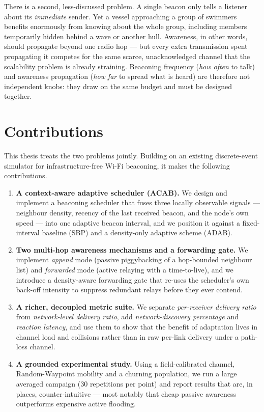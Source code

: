 \documentclass[12pt,a4paper,oneside]{report}
\begin{document}
There is a second, less-discussed problem. A single beacon only tells a listener
about its \emph{immediate} sender. Yet a vessel approaching a group of swimmers
benefits enormously from knowing about the whole group, including members
temporarily hidden behind a wave or another hull. Awareness, in other words,
should propagate beyond one radio hop --- but every extra transmission spent
propagating it competes for the same scarce, unacknowledged channel that the
scalability problem is already straining. Beaconing frequency (\emph{how often}
to talk) and awareness propagation (\emph{how far} to spread what is heard) are
therefore not independent knobs: they draw on the same budget and must be
designed together.

\section{Contributions}
This thesis treats the two problems jointly. Building on an existing
discrete-event simulator for infrastructure-free Wi-Fi beaconing, it makes the
following contributions.

\begin{enumerate}[leftmargin=1.4em]
  \item \textbf{A context-aware adaptive scheduler (ACAB).} We design and
  implement a beaconing scheduler that fuses three locally observable signals
  --- neighbour density, recency of the last received beacon, and the node's own
  speed --- into one adaptive beacon interval, and we position it against a
  fixed-interval baseline (SBP) and a density-only adaptive scheme (ADAB).
  \item \textbf{Two multi-hop awareness mechanisms and a forwarding gate.} We
  implement \emph{append} mode (passive piggybacking of a hop-bounded neighbour
  list) and \emph{forwarded} mode (active relaying with a time-to-live), and we
  introduce a density-aware forwarding gate that re-uses the scheduler's own
  back-off intensity to suppress redundant relays before they ever contend.
  \item \textbf{A richer, decoupled metric suite.} We separate
  \emph{per-receiver delivery ratio} from \emph{network-level delivery ratio},
  add \emph{network-discovery percentage} and \emph{reaction latency}, and use
  them to show that the benefit of adaptation lives in channel load and
  collisions rather than in raw per-link delivery under a path-loss channel.
  \item \textbf{A grounded experimental study.} Using a field-calibrated
  channel, Random-Waypoint mobility and a churning population, we run a large
  averaged campaign ($30$ repetitions per point) and report results that are,
  in places, counter-intuitive --- most notably that cheap passive awareness
  outperforms expensive active flooding.
\end{enumerate}
\end{document}

